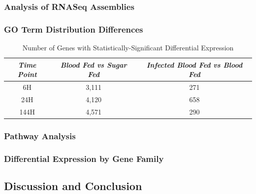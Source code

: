 \subsubsection{Analysis of RNASeq Assemblies}

\subsubsection{GO Term Distribution Differences}

\begin{table}[H]
  \centering
  \begin{tabular}{c c c} \hline
  \emph{Time Point} & \emph{Blood Fed vs Sugar Fed} & \emph{Infected Blood Fed vs Blood Fed} \\ \hline
  6H & 3,111 & 271 \\ \hline
  24H & 4,120 & 658 \\ \hline
  144H & 4,571 & 290 \\ \hline
  \end{tabular}
  \caption{Number of Genes with Statistically-Significant Differential Expression}
  \label{tab:stat-sig-genes}
\end{table}

\subsubsection{Pathway Analysis}

\subsubsection{Differential Expression by Gene Family}


\subsection{Discussion and Conclusion}